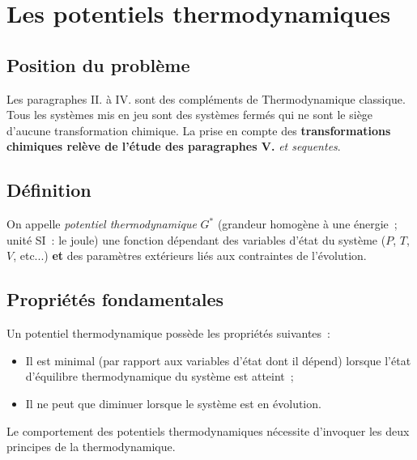\documentclass{article}
\begin{document}
\section{Les potentiels thermodynamiques}
\subsection{Position du problème}
Les paragraphes \textsf{II.} à \textsf{IV.} sont des compléments de Thermodynamique classique. Tous les systèmes mis en jeu sont des systèmes fermés qui ne sont le siège d'aucune transformation chimique. La prise en compte des \textbf{transformations chimiques relève de l'étude des paragraphes \textsf{V.}} \textit{et sequentes}.

\subsection{Définition}
\begin{enonce}
    On appelle \textit{potentiel thermodynamique} $G^*$ (grandeur homogène à une énergie~; unité SI~: le joule) une fonction dépendant des variables d'état du système ($P$, $T$, $V$, etc...) \textbf{et} des paramètres extérieurs liés aux contraintes de l'évolution\footnotemark{}.
\end{enonce}

\subsection{Propriétés fondamentales}
Un potentiel thermodynamique possède les propriétés suivantes~:
\begin{itemize}
    \item Il est minimal (par rapport aux variables d'état dont il dépend) lorsque l'état d'équilibre thermodynamique du système est atteint~;
    \item Il ne peut que diminuer lorsque le système est en évolution\footnotemark{}.
\end{itemize}

\begin{important}
    Le comportement des potentiels thermodynamiques nécessite d'invoquer les deux principes de la thermodynamique.
\end{important}
\end{document}
